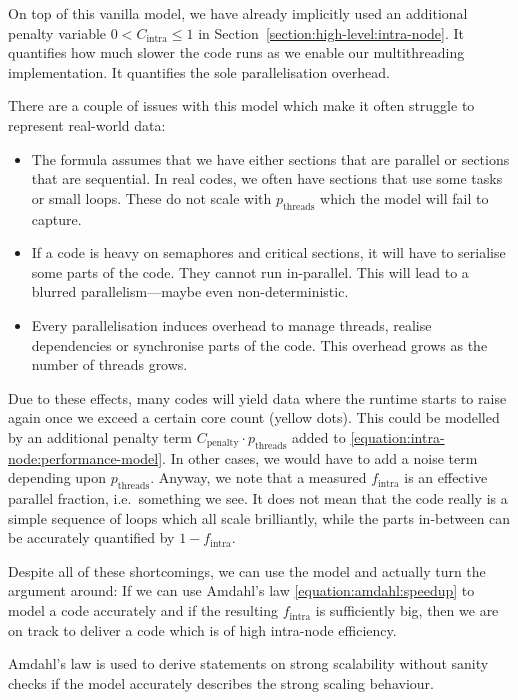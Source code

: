 On top of this vanilla model, we have already implicitly used an
additional penalty variable $0 < C_{\text{intra}} \leq 1$ in
Section~\ref{section:high-level:intra-node}.
It quantifies how much slower the code runs as we enable our multithreading
implementation.
It quantifies the sole parallelisation overhead.


There are a couple of issues with this model which make it often struggle to
represent real-world data:

\begin{itemize}
  \item The formula assumes that we have either sections that are parallel or
  sections that are sequential. In real codes, we often have sections that use
  some tasks or small loops. These do not scale with $p_{\text{threads}}$ which
  the model will fail to capture. 
  \item If a code is heavy on semaphores and critical sections, it will have to
  serialise some parts of the code. They cannot run in-parallel. This will lead
  to a blurred parallelism---maybe even non-deterministic.
  \item Every parallelisation induces overhead to manage threads, realise
  dependencies or synchronise parts of the code. This overhead grows as the
  number of threads grows.
\end{itemize}



\noindent
Due to these effects, many codes will yield data where the runtime starts to
raise again once we exceed a certain core count (yellow dots).
This could be modelled by an additional penalty term $C_{\text{penalty}} \cdot p_{\text{threads}} $ added to \eqref{equation:intra-node:performance-model}.
In other cases, we would have to add a noise term depending upon
$p_{\text{threads}}$.
Anyway, we note that a measured $f_{\text{intra}}$ is an effective parallel
fraction, i.e.~something we see. 
It does not mean that the code really is a simple sequence of loops which all
scale brilliantly, while the parts in-between can be accurately quantified by
$1-f_{\text{intra}}$.


Despite all of these shortcomings, we can use the model and actually turn the
argument around:
If we can use Amdahl's law \eqref{equation:amdahl:speedup} to model a code
accurately and if the resulting $f_{\text{intra}}$ is sufficiently big, then we
are on track to deliver a code which is of high intra-node efficiency.


\begin{assessmentcrime}
 Amdahl's law is used to derive statements on strong scalability without sanity
 checks if the model accurately describes the strong scaling behaviour.
\end{assessmentcrime}



